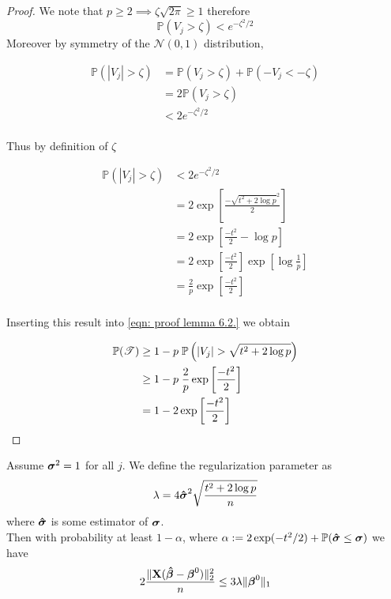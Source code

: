 \begin{proof}
    We note that $p \geq 2 \implies \zeta \sqrt{2 \pi} \geq 1$ therefore
    $$
        \mathbb{P}(V_j > \zeta) <  e^{-\zeta^2/2}
    $$
    Moreover by symmetry of the $\mathscr{N} (0,1)$ distribution,

    \begin{align*}
        \mathbb{P} (|V_j| > \zeta) & = \mathbb{P} (V_j > \zeta) + \mathbb{P} (- V_j < - \zeta) \\
                                   & = 2 \mathbb{P} (V_j > \zeta)                              \\
                                   & < 2 e^{-\zeta^2/2}                                        \\
    \end{align*}

    Thus by definition of $\zeta$

    \begin{align*}
        \mathbb{P} (|V_j| > \zeta) & < 2 e^{-\zeta^2/2}                                                             \\
                                   & = 2 \exp \left[ \frac{- \sqrt{t^{2} + 2 \log p} ^2}{2} \right]                 \\
                                   & = 2 \exp \left[ \frac{- t^{2}}{2} - \log p \right]                             \\
                                   & = 2 \exp \left[ \frac{- t^{2}}{2} \right] \exp \left[ \log \frac{1}{p} \right] \\
                                   & = \frac{2}{p} \exp \left[ \frac{- t^{2}}{2} \right]                            \\
    \end{align*}

    Inserting this result into \eqref{eqn: proof lemma 6.2.} we obtain

    \begin{align*}
        \mathbb{P}(\mathscr{T}) & \geq 1 - p \; \P \left( | V_{j} | > \sqrt{t^{2}+2 \log p}  \right) \\
                                & \geq 1 - p \; \frac{2}{p} \exp \left[ \frac{- t^{2}}{2} \right]    \\
                                & = 1 - 2 \exp \left[ \frac{- t^{2}}{2} \right]                      \\
    \end{align*}
\end{proof}

\begin{corollary}
    Assume $\sgm^2 = 1$ for all $j$. We define the regularization parameter as
    $$\lambda = 4 \sgmhat^2 \sqrt{\frac{t^2 + 2 \log p}{n}}$$
    where $\sgmhat$ is some estimator of $\sgm$. \\
    Then with probability at least $1 - \alpha$, where $\alpha := 2 \exp(-t^2/2) + \P (\sgmhat \leq \sgm)$ we have
    $$2 \frac{\| \X (\btahat - \bta^0)\|_2^2}{n} \leq 3 \lambda \| \bta^0 \|_1$$
\end{corollary}

